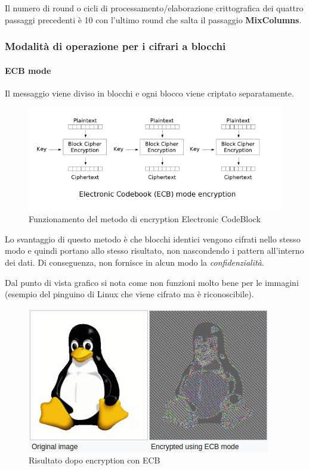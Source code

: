Il numero di round o cicli di processamento/elaborazione crittografica dei quattro passaggi precedenti è 10 con l'ultimo round che salta il passaggio \textbf{MixColumns}.

\subsubsection{Modalità di operazione per i cifrari a blocchi}

\paragraph{ECB mode}

Il messaggio viene diviso in blocchi e ogni blocco viene criptato separatamente.

\begin{figure}[H]
\centering
\includegraphics[scale=0.65]{res/img/ecb.png}
\caption{Funzionamento del metodo di encryption Electronic CodeBlock}
\label{fig:password:ecb}
\end{figure}

Lo svantaggio di questo metodo è che blocchi identici vengono cifrati nello 
stesso modo e quindi portano allo stesso risultato, non nascondendo i pattern 
all'interno dei dati. Di conseguenza, non fornisce in alcun modo la 
\textit{confidenzialità}.

Dal punto di vista grafico si nota come non funzioni molto bene per le 
immagini (esempio del pinguino di Linux che viene cifrato ma è riconoscibile).

\begin{figure}[H]
\centering
\includegraphics[scale=0.65]{res/img/password_linux.png}
\caption{Risultato dopo encryption con ECB}
\label{fig:password:linux_ecb}
\end{figure}

